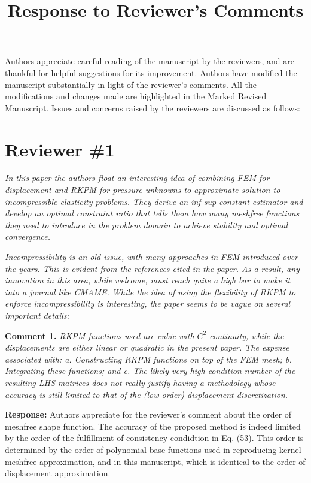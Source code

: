 \documentclass{article}
\title{Response to Reviewer's Comments}
\author{}
\date{}
\begin{document}
\maketitle

Authors appreciate careful reading of the manuscript by the reviewers, and are thankful for helpful suggestions for its improvement. Authors have modified the manuscript substantially in light of the reviewer's comments. All the modifications and changes made are highlighted in the Marked Revised Manuscript. Issues and concerns raised by the reviewers are discussed as follows:

\section*{Reviewer \#1}
\textit{In this paper the authors float an interesting idea of combining FEM for displacement and RKPM for pressure unknowns to approximate solution to incompressible elasticity problems. They derive an inf-sup constant estimator and develop an optimal constraint ratio that tells them how many meshfree functions they need to introduce in the problem domain to achieve stability and optimal convergence.}

\textit{Incompressibility is an old issue, with many approaches in FEM introduced over the years. This is evident from the references cited in the paper. As a result, any innovation in this area, while welcome, must reach quite a high bar to make it into a journal like CMAME. While the idea of using the flexibility of RKPM to enforce incompressibility is interesting, the paper seems to be vague on several important details:}

\textbf{Comment 1.} \textit{RKPM functions used are cubic with $C^2$-continuity, while the displacements are either linear or quadratic in the present paper. The expense associated with: a. Constructing RKPM functions on top of the FEM mesh; b. Integrating these functions; and c. The likely very high condition number of the resulting LHS matrices does not really justify having a methodology whose accuracy is still limited to that of the (low-order) displacement discretization.}

\textbf{Response:} 
Authors appreciate for the reviewer's comment about the order of meshfree shape function.
The accuracy of the proposed method is indeed limited by the order of the fulfillment of consistency condidtion in Eq. (53).
This order is determined by the order of polynomial base functions used in reproducing kernel meshfree approximation, and in this manuscript, which is identical to the order of displacement approximation.
\end{document}
